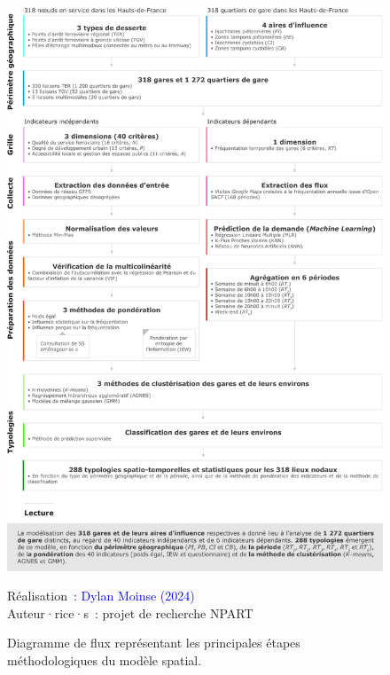 \begin{refsegment}
    \begin{figure}[h!]\vspace*{4pt}
        \caption{Diagramme de flux représentant les principales étapes méthodologiques du modèle spatial.}
        \label{fig-chap6:schema-methodologie}
        \centerline{\includegraphics[width=1\columnwidth]{src/Figures/Chap-6/FR_NPART_Schema_Methodologie.pdf}}
        \vspace{5pt}
        \begin{flushright}\scriptsize{
        Réalisation~: \textcolor{blue}{Dylan Moinse (2024)}
        \\
        Auteur·rice·s~: projet de recherche \acrshort{NPART}
        }\end{flushright}
    \end{figure}


\end{refsegment}
